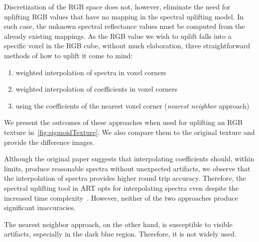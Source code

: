 Discretization of the RGB space does not, however, eliminate the need for uplifting RGB values that have no mapping in the spectral uplifting model. In such case, the unknown spectral reflectance values must be computed from the already existing mappings. As the RGB value we wish to uplift falls into a specific voxel in the RGB cube, without much elaboration, three straightforward methods of how to uplift it come to mind:
\begin{enumerate}
	\item weighted interpolation of spectra in voxel corners
	\item weighted interpolation of coefficients in voxel corners
	\item using the coefficients of the nearest voxel corner (\emph{nearest neighbor} approach)
\end{enumerate}

We present the outcomes of these approaches when used for uplifting an RGB texture in~\cref{fig:sigmoidTexture}. We also compare them to the original texture and provide the difference images.

Although the original paper suggests that interpolating coefficients should, within limits, produce reasonable spectra without unexpected artifacts, we observe that the interpolation of spectra provides higher round trip accuracy. Therefore, the spectral uplifting tool in ART opts for interpolating spectra even despite the increased time complexity~\cite{ARTsigmoids}. However, neither of the two approaches produce significant inaccuracies.

The nearest neighbor approach, on the other hand, is susceptible to visible artifacts, especially in the dark blue region. Therefore, it is not widely used.

